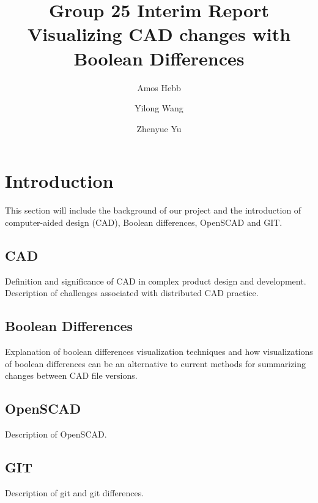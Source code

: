\documentclass[sigconf,authorversion,nonacm]{acmart}
\begin{document}
\title{Group 25 Interim Report\\Visualizing CAD changes with Boolean Differences}

\author{Amos Hebb}
\author{Yilong Wang}
\author{Zhenyue Yu}
\makeatletter
\def\@ACM@checkaffil{%
	\if@ACM@instpresent\else
		\ClassWarningNoLine{\@classname}{No institution present for an affiliation}%
	\fi
	\if@ACM@citypresent\else
		\ClassWarningNoLine{\@classname}{No city present for an affiliation}%
	\fi
	\if@ACM@countrypresent\else
		\ClassWarningNoLine{\@classname}{No country present for an affiliation}%
	\fi
}
\makeatother

\maketitle

\section{Introduction}
This section will include the background of our project and the introduction of computer-aided design (CAD), Boolean differences, OpenSCAD and GIT. 
\subsection{CAD}
Definition and significance of CAD in complex product design and development. Description of challenges associated with distributed CAD practice.
\subsection{Boolean Differences}
Explanation of boolean differences visualization techniques and how visualizations of boolean differences can be an alternative to current methods for summarizing changes between CAD file versions.
\subsection{OpenSCAD}
Description of OpenSCAD.
\subsection{GIT}
Description of git and git differences.
\end{document}
